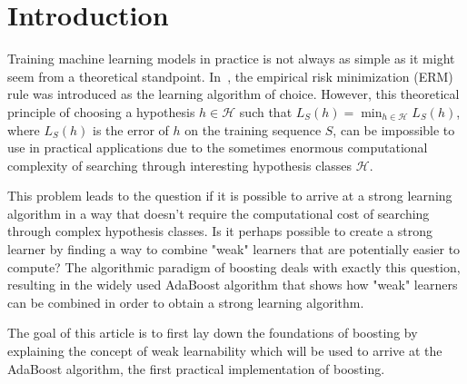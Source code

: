 \section{Introduction}

Training machine learning models in practice is not always as simple as it might seem from a theoretical standpoint.
In~\cite[chapter 2]{SSBD14}, the empirical risk minimization (ERM) rule was introduced as the learning algorithm
of choice.
However, this theoretical principle of choosing a hypothesis \mbox{$h \in \mathcal{H}$} such that
$L_S(h) = \min_{h \in \mathcal{H}} L_S(h)$, where $L_S(h)$ is the error of $h$ on the training sequence $S$,
can be impossible to use in practical applications due to the sometimes enormous computational complexity of searching
through interesting hypothesis classes $\mathcal{H}$.

This problem leads to the question if it is possible to arrive at a strong learning algorithm in a way that doesn't require the
computational cost of searching through complex hypothesis classes.
Is it perhaps possible to create a strong learner by finding a way to combine "weak" learners that are potentially easier to compute?
The algorithmic paradigm of boosting deals with exactly this question, resulting in the widely used AdaBoost algorithm that
shows how "weak" learners can be combined in order to obtain a strong learning algorithm.

The goal of this article is to first lay down the foundations of boosting by explaining the concept of weak 
learnability which
will be used to arrive at the AdaBoost algorithm, the first practical implementation of boosting.
